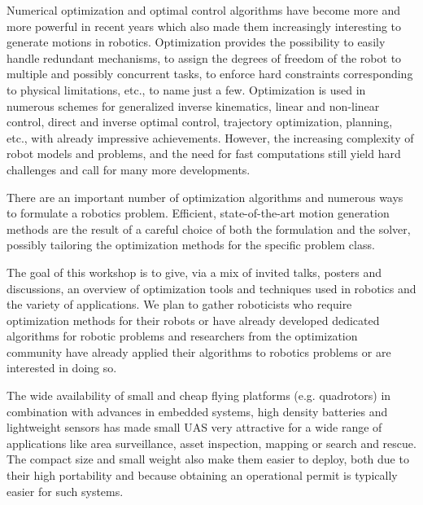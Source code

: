 \begin{spacing}{1.0}
{
Numerical optimization and optimal control algorithms have become more and more powerful in recent years which also made them increasingly interesting to generate motions in robotics.  Optimization provides the possibility to easily handle redundant mechanisms, to assign the degrees of freedom of the robot to multiple and possibly concurrent tasks, to enforce hard constraints corresponding to physical limitations, etc., to name just a few.  Optimization is used in numerous schemes for generalized inverse kinematics, linear and non-linear control, direct and inverse optimal control, trajectory optimization, planning, etc., with already impressive achievements. However, the increasing complexity of robot models and problems, and the need for fast computations still yield hard challenges and call for many more developments.

There are an important number of optimization algorithms and numerous ways to formulate a robotics problem. Efficient, state-of-the-art motion generation methods are the result of a careful choice of both the formulation and the solver, possibly tailoring the optimization methods for the specific problem class.

The goal of this workshop is to give, via a mix of invited talks, posters and discussions, an overview of optimization tools and techniques used in robotics and the variety of applications. We plan to gather roboticists who require optimization methods for their robots or have already developed dedicated algorithms for robotic problems and researchers from the optimization community have already applied their algorithms to robotics problems or are interested in doing so. 
}




{
The wide availability of small and cheap flying platforms (e.g. quadrotors) in combination with advances in embedded systems, high density batteries and lightweight sensors has made small UAS very attractive for a wide range of applications like area surveillance, asset inspection, mapping or search and rescue. The compact size and small weight also make them easier to deploy, both due to their high portability and because obtaining an operational permit is typically easier for such systems.

}
\end{spacing}
